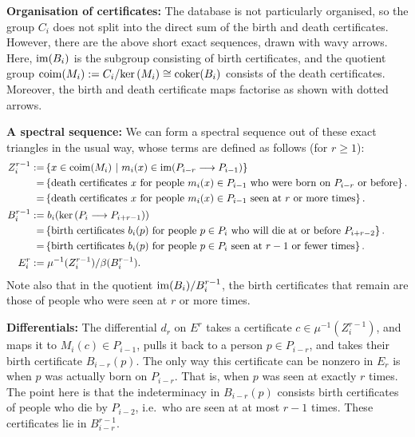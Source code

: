 \documentclass[11pt]{article}
\begin{document}
\Bullet \textbf{Organisation of certificates:} The database is not particularly
organised, so the group $C_{i}$ does not split into the direct sum of the birth
and death certificates. However, there are the above short exact sequences,
drawn with wavy arrows. Here, $\operatorname{im}(B_{i})$ is the subgroup consisting of birth
certificates, and the quotient group
$\operatorname{coim}(M_{i}):=C_i/\textup{ker}\,(M_i)\cong\operatorname{coker}(B_i)$ consists of the death
certificates. Moreover, the birth and death certificate maps factorise as shown
with dotted arrows.

\Bullet \textbf{A spectral sequence:} We can form a spectral sequence out of
these exact triangles in the usual way, whose terms are defined as follows (for
$r\geq1$):
\begin{alignat*}{2}
Z_{i}^{r-1}:=&\left\{x\in \operatorname{coim}(M_i)\ \middle|\ m_i(x)\in\operatorname{im}(P_{i-r}\longrightarrow
P_{i-1})\right\}\\
=&\left\{\text{death certificates $x$ for people $m_i(x)\in P_{i-1}$ who were
born on $P_{i-r}$ or before}\right\}.\\
=&\left\{\text{death certificates $x$ for people $m_i(x)\in P_{i-1}$ seen at $r$
or more times}\right\}.\\
B_{i}^{r-1}:=&\left.b_i(\textup{ker}\,(P_i\longrightarrow P_{i+r-1}))\right.\\
=&\left\{\text{birth certificates $b_i(p)$ for people $p\in P_i$ who will die at
or before $P_{i+r-2}$}\right\}.\\
=&\left\{\text{birth certificates $b_i(p)$ for people $p\in P_i$ seen at $r-1$
or fewer times}\right\}.\\
E_{i}^{r}:=&\left.\mu^{-1}(Z_{i}^{r-1})/\beta(B_{i}^{r-1}).\right.
\end{alignat*}
Note also that in the quotient $\operatorname{im}(B_i)/B_i^{r-1}$, the birth certificates that
remain are those of people who were seen at $r$ or more times.

\Bullet \textbf{Differentials:} The differential $d_r$ on $E^{r}$ takes a
certificate $c\in\mu^{-1}(Z_i^{r-1})$, and maps it to $M_i(c)\in P_{i-1}$, pulls
it back to a person $p\in P_{i-r}$, and takes their birth certificate
$B_{i-r}(p)$. The only way this certificate can be nonzero in $E_r$ is when $p$
was actually born on $P_{i-r}$. That is, when $p$ was seen at exactly $r$ times.
The point here is that the indeterminacy in $B_{i-r}(p)$ consists birth
certificates of people who die by $P_{i-2}$, i.e.\ who are seen at at most $r-1$
times. These certificates lie in $B_{i-r}^{r-1}$.
\end{document}
